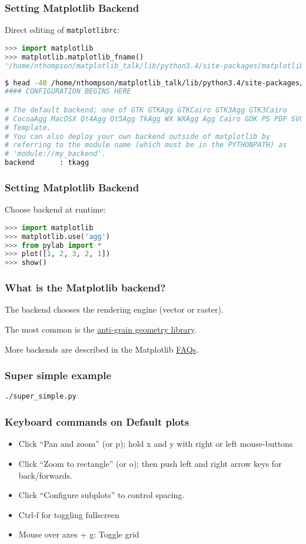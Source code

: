 \documentclass{beamer}
\begin{document}
\begin{frame}[fragile]
\frametitle{Setting Matplotlib Backend}
Direct editing of \texttt{matplotlibrc}:
\begin{lstlisting}[language=Python]
>>> import matplotlib
>>> matplotlib.matplotlib_fname()
'/home/nthompson/matplotlib_talk/lib/python3.4/site-packages/matplotlib/mpl-data/matplotlibrc'
\end{lstlisting}
\begin{lstlisting}[language=bash]
$ head -40 /home/nthompson/matplotlib_talk/lib/python3.4/site-packages/matplotlib/mpl-data/matplotlibrc
#### CONFIGURATION BEGINS HERE

# The default backend; one of GTK GTKAgg GTKCairo GTK3Agg GTK3Cairo
# CocoaAgg MacOSX Qt4Agg Qt5Agg TkAgg WX WXAgg Agg Cairo GDK PS PDF SVG
# Template.
# You can also deploy your own backend outside of matplotlib by
# referring to the module name (which must be in the PYTHONPATH) as
# 'module://my_backend'.
backend      : tkagg
\end{lstlisting}
\end{frame}

\begin{frame}[fragile]
\frametitle{Setting Matplotlib Backend}
Choose backend at runtime:
\begin{lstlisting}[language=Python]
>>> import matplotlib
>>> matplotlib.use('agg')
>>> from pylab import *
>>> plot([1, 2, 3, 2, 1])
>>> show()
\end{lstlisting}
\end{frame}

\begin{frame}
\frametitle{What is the Matplotlib backend?}
The backend chooses the rendering engine (vector or raster).

The most common is the \href{http://agg.sourceforge.net/antigrain.com/index.html}{anti-grain geometry library}.

More backends are described in the Matplotlib \href{http://matplotlib.org/faq/usage_faq.html}{FAQs}.

\end{frame}

\begin{frame}
\frametitle{Super simple example}

\texttt{./super\_simple.py}

\end{frame}

\begin{frame}
\frametitle{Keyboard commands on Default plots}

\begin{itemize}

\item Click ``Pan and zoom'' (or p); hold x and y with right or left mouse-buttons
\item Click ``Zoom to rectangle'' (or o); then push left and right arrow keys for back/forwards.
\item Click ``Configure subplots'' to control spacing.
\item Ctrl-f for toggling fullscreen
\item Mouse over axes + g: Toggle grid
\end{itemize}

\end{frame}
\end{document}
